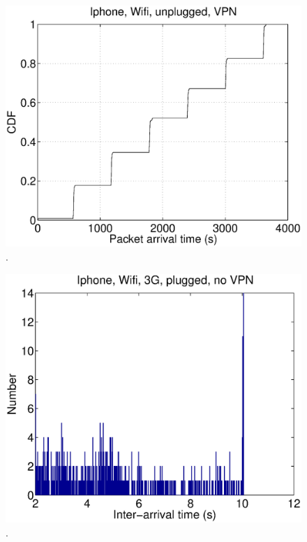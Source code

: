 \begin{figure}
\centering
        \includegraphics[width=0.8\linewidth]{../../code/pushNotification/Fig/bw_iphone_wifi_unplug_vpn_ts.eps}
  \caption{.}
  \label{fig:}
\end{figure}



\begin{figure}
\centering
        \includegraphics[width=0.8\linewidth]{../../code/pushNotification/Fig/bw_iphone_wifi_3g_plug_novpn_interTs.eps}
  \caption{.}
  \label{fig:}
\end{figure}


